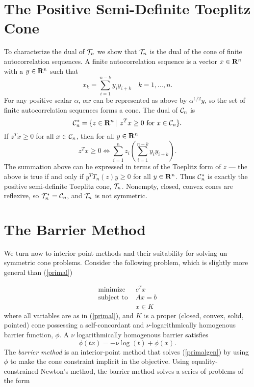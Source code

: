 \documentclass{article}
\begin{document}
\section{The Positive Semi-Definite Toeplitz Cone}

To characterize the dual of $\mathcal{T}_n$ we show that $\mathcal{T}_n$ is the dual of the 
cone of finite autocorrelation sequences. A finite autocorrelation sequence is a vector
$x \in \mathbf{R}^n$ with a $y \in \mathbf{R}^n$ such that 
\[
  x_k = \sum_{i=1}^{n-k} y_iy_{i+k} \quad k=1,\ldots,n.
\] 
For any positive scalar $\alpha$, $\alpha x$ can be represented as above 
by $\alpha^{1/2}y$, so the set of finite autocorrelation sequences forms a cone.
The dual of $\mathcal{C}_n$ is 
\[
  \mathcal{C}^*_n = \{z \in \mathbf{R}^n \mid z^Tx \geq 0 \text{ for } x \in \mathcal{C}_n\}.
\]
If $z^Tx \geq 0$ for all $x \in \mathcal{C}_n$, then for all
$y \in \mathbf{R}^n$ 
\[
  z^Tx \geq 0 \iff \sum_{i=1}^n z_i \left(\sum_{i=1}^{n-k} y_iy_{i+k}\right).
\]
The summation above can be expressed in terms of the Toeplitz form of $z$ ---
the above is true if and only if $y^TT_n(z)y \geq 0$ for all $y \in \mathbf{R}^n$. Thus
$\mathcal{C}^*_n$ is exactly the positive semi-definite Toeplitz cone, $\mathcal{T}_n$. Nonempty,
closed, convex cones are reflexive, so $\mathcal{T}_n^* = \mathcal{C}_n$, and $\mathcal{T}_n$ is not
symmetric.


\section{The Barrier Method}

We turn now to interior point methods and their suitability for
solving un-symmetric cone problems. Consider the following problem, which is slightly 
more general than (\ref{primal})

\begin{equation}\label{primalgen}
  \begin{array}{ll}
    \mbox{minimize}    & c^Tx \\
    \mbox{subject to } & Ax = b \\
                       & x \in K
  \end{array}
\end{equation}
where all variables are as in (\ref{primal}), and $K$ is a proper (closed, convex, solid, pointed) cone 
possessing a self-concordant and $\nu$-logarithmically homogenous barrier function, $\phi$.
A $\nu$ logarithmically homogenous barrier satisfies
\[
  \phi(tx) = -\nu \log(t) + \phi(x).
\]
The \emph{barrier method} is an interior-point method that solves (\ref{primalgen}) by using
$\phi$ to make the cone constraint implicit in the objective. Using equality-constrained
Newton's method, the barrier method solves a series of problems of the form
\end{document}
